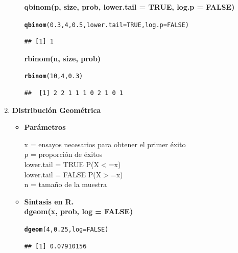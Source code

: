 \documentclass[12pt,letterpaper]{article}\usepackage[]{graphicx}\usepackage[]{color}
\makeatletter
\newcommand{\hlnum}[1]{\textcolor[rgb]{0.686,0.059,0.569}{#1}}%
\newcommand{\hlstd}[1]{\textcolor[rgb]{0.345,0.345,0.345}{#1}}%
\newcommand{\hlkwc}[1]{\textcolor[rgb]{0.333,0.667,0.333}{#1}}%
\newcommand{\hlkwd}[1]{\textcolor[rgb]{0.737,0.353,0.396}{\textbf{#1}}}%
\newenvironment{kframe}{%
 \def\at@end@of@kframe{}%
 \ifinner\ifhmode%
  \def\at@end@of@kframe{\end{minipage}}%
  \begin{minipage}{\columnwidth}%
 \fi\fi%
 \def\FrameCommand##1{\hskip\@totalleftmargin \hskip-\fboxsep
 \colorbox{shadecolor}{##1}\hskip-\fboxsep
     \hskip-\linewidth \hskip-\@totalleftmargin \hskip\columnwidth}%
 \MakeFramed {\advance\hsize-\width
   \@totalleftmargin\z@ \linewidth\hsize
   \@setminipage}}%
 {\par\unskip\endMakeFramed%
 \at@end@of@kframe}
\newenvironment{knitrout}{}{} %
\makeatother
\begin{document}
\begin{enumerate}
\begin{itemize}
\textbf{qbinom(p, size, prob, lower.tail = TRUE, log.p = FALSE)}
\begin{knitrout}
\color{fgcolor}\begin{kframe}
\begin{alltt}
\hlkwd{qbinom}\hlstd{(}\hlnum{0.3}\hlstd{,} \hlnum{4}\hlstd{,} \hlnum{0.5}\hlstd{,} \hlkwc{lower.tail} \hlstd{=} \hlnum{TRUE}\hlstd{,} \hlkwc{log.p} \hlstd{=} \hlnum{FALSE}\hlstd{)}
\end{alltt}
\begin{verbatim}
## [1] 1
\end{verbatim}
\end{kframe}
\end{knitrout}

\textbf{rbinom(n, size, prob)} 
\begin{knitrout}
\color{fgcolor}\begin{kframe}
\begin{alltt}
\hlkwd{rbinom}\hlstd{(}\hlnum{10}\hlstd{,} \hlnum{4}\hlstd{,} \hlnum{0.3}\hlstd{)}
\end{alltt}
\begin{verbatim}
##  [1] 2 2 1 1 1 0 2 1 0 1
\end{verbatim}
\end{kframe}
\end{knitrout}

\end{itemize}

\item  \textbf{Distribuci\'on Geom\'etrica}
\begin{itemize}
\item \textbf{Par\'ametros}
\begin{center}
x = ensayos necesarios para obtener el primer \'exito\\
p = proporci\'on de \'exitos\\
lower.tail = TRUE P(X$<$=x)\\
lower.tail = FALSE P(X$>$=x)\\ 
n = tama\~no de la muestra 
\end{center}
  
\item \textbf{Sintasis en R.}\\

\textbf{dgeom(x, prob, log = FALSE)}
\begin{knitrout}
\color{fgcolor}\begin{kframe}
\begin{alltt}
\hlkwd{dgeom}\hlstd{(}\hlnum{4}\hlstd{,} \hlnum{0.25}\hlstd{,} \hlkwc{log} \hlstd{=} \hlnum{FALSE}\hlstd{)}
\end{alltt}
\begin{verbatim}
## [1] 0.07910156
\end{verbatim}
\end{kframe}
\end{knitrout}


\end{itemize}
\end{enumerate}
\end{document}
